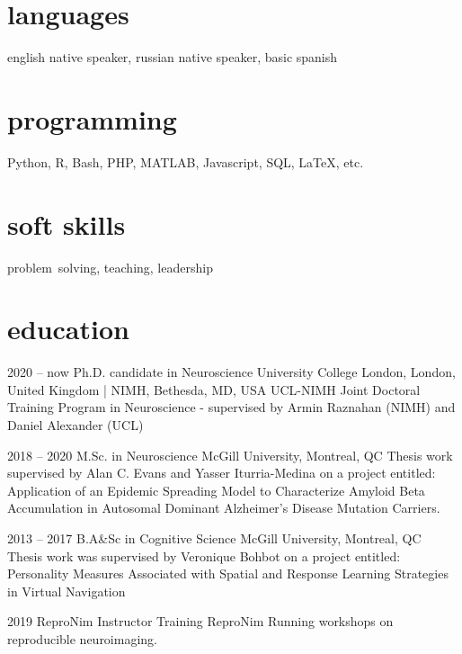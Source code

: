 \documentclass[]{friggeri-cv} %
\begin{document}
\begin{aside}
\section{languages}
english native speaker,
russian native speaker,
basic spanish
\section{programming}
Python, R, Bash, PHP,
MATLAB, Javascript,
SQL, LaTeX, etc.
\section{soft skills}
problem~solving, teaching, leadership
\end{aside}


\section{education}

\begin{entrylist}

\entry
{2020 -- now}
{Ph.D. candidate {\normalfont in Neuroscience}}
{University College London, London, United Kingdom | NIMH, Bethesda, MD, USA}
{UCL-NIMH Joint Doctoral Training Program in Neuroscience - supervised by Armin Raznahan (NIMH) and 
Daniel Alexander (UCL)}

\entry
{2018 -- 2020}
{M.Sc. {\normalfont in Neuroscience}}
{McGill University, Montreal, QC}
{Thesis work supervised by Alan C. Evans and Yasser Iturria-Medina on a project entitled:\\ 
Application of an Epidemic Spreading Model to Characterize Amyloid Beta Accumulation in Autosomal Dominant Alzheimer’s Disease Mutation Carriers.
}

\entry
{2013 -- 2017}
{B.A\&Sc {\normalfont in Cognitive Science}}
{McGill University, Montreal, QC}
{Thesis work was supervised by Veronique Bohbot on a project entitled:\\ 
Personality Measures Associated with Spatial and Response Learning Strategies
in Virtual Navigation}


\entry
{2019}
{ReproNim Instructor Training}
{ReproNim}
{Running workshops on reproducible neuroimaging.}

\end{entrylist}
\end{document}

